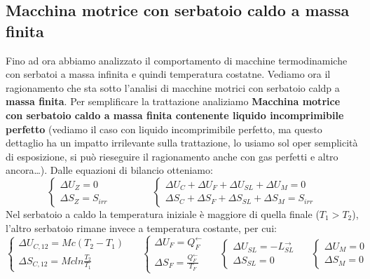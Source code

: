 \subsection{Macchina motrice con serbatoio caldo a massa finita}
Fino ad ora abbiamo analizzato il comportamento di macchine termodinamiche con serbatoi a massa infinita e quindi temperatura costatne. Vediamo ora il ragionamento che sta sotto l'analisi di macchine motrici con serbatoio caldp a \textbf{massa finita}.\newline
\newline
Per semplificare la trattazione analiziamo \textbf{Macchina motrice con serbatoio caldo a massa finita contenente liquido incomprimibile perfetto} (vediamo il caso con liquido incomprimibile perfetto, ma questo dettaglio ha un impatto irrilevante sulla trattazione, lo usiamo sol oper semplicità di esposizione, si può rieseguire il ragionamento anche con gas perfetti e altro ancora\dots).\newline
\newline
Dalle equazioni di bilancio otteniamo:
\[
    \begin{cases}
        \Delta U_Z = 0\\ \Delta S_Z = S_{irr}
    \end{cases} \;\;\;\;\;\;\;\;\;\;\;\;\;\;\; \begin{cases}
        \Delta U_C + \Delta U_F + \Delta U_{SL} + \Delta U_M = 0 \\
        \Delta S_C + \Delta S_F + \Delta S_{SL} + \Delta S_M = S_{irr}
    \end{cases}
\]
Nel serbatoio a caldo la temperatura iniziale è maggiore di quella finale ($T_1 > T_2$), l'altro serbatoio rimane invece a temperatura costante, per cui:
\[ 
    \begin{cases}
        \Delta U_{C,12} = Mc(T_2 -T_1)\\ \Delta S_{C,12} = Mcln \frac{T_2}{T_1}
    \end{cases}\;\;\;\;\; \begin{cases}
        \Delta U_F = Q_F^\leftarrow \\ \Delta S_F = \frac{Q_F^\leftarrow}{T_F}
    \end{cases} \;\;\;\;\; \begin{cases}
        \Delta U_{SL} = - L_{SL}^\rightarrow \\ \Delta S_{SL} = 0
    \end{cases} \;\;\;\;\; \begin{cases}
        \Delta U_M = 0\\ \Delta S_M = 0
    \end{cases}
\]
